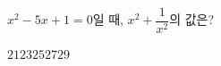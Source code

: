 $x^2-5x+1=0$일 때, $x^2+\dfrac{1}{x^2}$의 값은?
\begin{choices32}{$21$}{$23$}{$25$}{$27$}{$29$}\end{choices32}
